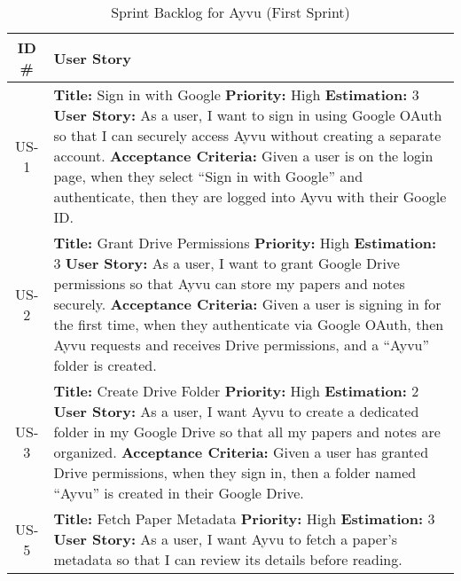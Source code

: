 \documentclass[12pt]{article}
\begin{document}
\begin{longtable}{|c|p{16cm}|}
  \caption{Sprint Backlog for Ayvu (First Sprint)}
  \label{tab:sprint-backlog} \\
  \hline
  \textbf{ID \#} & \textbf{User Story} \\
  \hline
  US-1 &
  \textbf{Title:} Sign in with Google \newline
  \textbf{Priority:} High \newline
  \textbf{Estimation:} 3 \newline
  \textbf{User Story:} As a user, I want to sign in using Google OAuth so that I can securely access Ayvu without creating a separate account. \newline
  \textbf{Acceptance Criteria:} Given a user is on the login page, when they select ``Sign in with Google'' and authenticate, then they are logged into Ayvu with their Google ID. \\
  \hline
  US-2 &
  \textbf{Title:} Grant Drive Permissions \newline
  \textbf{Priority:} High \newline
  \textbf{Estimation:} 3 \newline
  \textbf{User Story:} As a user, I want to grant Google Drive permissions so that Ayvu can store my papers and notes securely. \newline
  \textbf{Acceptance Criteria:} Given a user is signing in for the first time, when they authenticate via Google OAuth, then Ayvu requests and receives Drive permissions, and a ``Ayvu'' folder is created. \\
  \hline
  US-3 &
  \textbf{Title:} Create Drive Folder \newline
  \textbf{Priority:} High \newline
  \textbf{Estimation:} 2 \newline
  \textbf{User Story:} As a user, I want Ayvu to create a dedicated folder in my Google Drive so that all my papers and notes are organized. \newline
  \textbf{Acceptance Criteria:} Given a user has granted Drive permissions, when they sign in, then a folder named ``Ayvu'' is created in their Google Drive. \\
  \hline
  US-5 &
  \textbf{Title:} Fetch Paper Metadata \newline
  \textbf{Priority:} High \newline
  \textbf{Estimation:} 3 \newline
  \textbf{User Story:} As a user, I want Ayvu to fetch a paper's metadata so that I can review its details before reading. \newline

\end{longtable}
\end{document}
